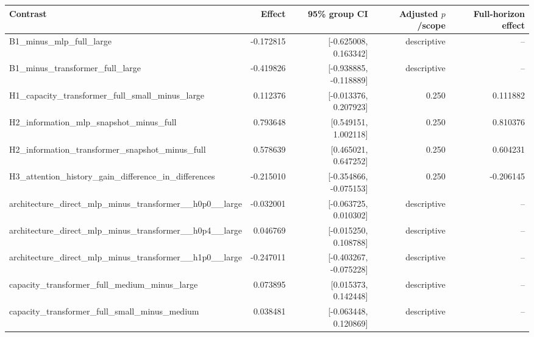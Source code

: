 \begin{tabular}{lrrrr}
\toprule
Contrast & Effect & 95\% group CI & Adjusted $p$/scope & Full-horizon effect \\
\midrule
B1\_minus\_mlp\_full\_large & -0.172815 & [-0.625008, 0.163342] & descriptive & -- \\
B1\_minus\_transformer\_full\_large & -0.419826 & [-0.938885, -0.118889] & descriptive & -- \\
H1\_capacity\_transformer\_full\_small\_minus\_large & 0.112376 & [-0.013376, 0.207923] & 0.250 & 0.111882 \\
H2\_information\_mlp\_snapshot\_minus\_full & 0.793648 & [0.549151, 1.002118] & 0.250 & 0.810376 \\
H2\_information\_transformer\_snapshot\_minus\_full & 0.578639 & [0.465021, 0.647252] & 0.250 & 0.604231 \\
H3\_attention\_history\_gain\_difference\_in\_differences & -0.215010 & [-0.354866, -0.075153] & 0.250 & -0.206145 \\
architecture\_direct\_mlp\_minus\_transformer\_\_h0p0\_\_large & -0.032001 & [-0.063725, 0.010302] & descriptive & -- \\
architecture\_direct\_mlp\_minus\_transformer\_\_h0p4\_\_large & 0.046769 & [-0.015250, 0.108788] & descriptive & -- \\
architecture\_direct\_mlp\_minus\_transformer\_\_h1p0\_\_large & -0.247011 & [-0.403267, -0.075228] & descriptive & -- \\
capacity\_transformer\_full\_medium\_minus\_large & 0.073895 & [0.015373, 0.142448] & descriptive & -- \\
capacity\_transformer\_full\_small\_minus\_medium & 0.038481 & [-0.063448, 0.120869] & descriptive & -- \\
\bottomrule
\end{tabular}
